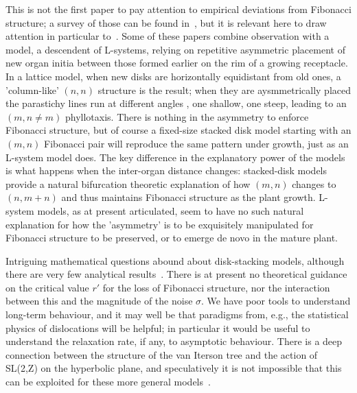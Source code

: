 \documentclass[a4paper,10pt]{amsart}
\begin{document}
 This is not the first paper to pay attention to empirical deviations from Fibonacci structure; a survey of those can be found in~\cite{swintonMathematicalPhyllotaxis2025}, but it is relevant here to draw attention in particular to~\cite{zagorska-marekSignificanceGandLdislocations2016,zagorska-marekVerbenaOfficinalisVerbenaceae2021,szpakPhyllotaxisInstabilityExploring2011,zagorska-marekVirtualPhyllotaxisReal2008,zhangPhyllotacticPatterningGerbera2021,zhangRepatterningInflorescenceMeristem2021}.
 Some of these papers combine observation with a model, a descendent of L-systems,  relying on repetitive asymmetric placement of new organ initia between those formed earlier on the rim of a growing receptacle. In a lattice model, when new disks are horizontally equidistant from old ones, a  'column-like' $(n,n)$ structure is the result; when they are aysmmetrically placed  the parastichy lines run at different angles , one shallow, one steep, leading to an $(m,n\neq m)$ phyllotaxis. There is nothing in the asymmetry to enforce Fibonacci structure, but of course a fixed-size stacked disk model starting with an $(m,n)$ Fibonacci pair will reproduce the same pattern under growth, just as an L-system model does. The key difference in the explanatory power of the models is what happens when the inter-organ distance changes: stacked-disk models provide a natural bifurcation theoretic explanation of how $(m,n)$ changes to $(n,m+n)$ and thus maintains Fibonacci structure as the plant growth. L-system models, as at present articulated, seem to have no such natural explanation for how the 'asymmetry' is to be exquisitely manipulated for Fibonacci structure to be preserved, or to emerge de novo in the mature plant. 
 

Intriguing mathematical questions abound about  disk-stacking models, although there are very few analytical results~\cite{goleConvergenceDiskStacking2020}. There is at present no theoretical guidance on the critical value $r'$ for the loss of Fibonacci structure, nor the interaction between this and the magnitude of the noise $\sigma$.  We have poor tools to understand  long-term behaviour, and it may well be that paradigms from, e.g., the statistical physics of dislocations will be helpful; in  particular it would be useful to understand the relaxation rate, if any, to asymptotic behaviour.  There is a deep connection between the structure of the van Iterson tree and the action of SL(2,Z) on the hyperbolic plane, and speculatively it is not impossible that this can be exploited for these more general models~\cite{swintonMathematicalPhyllotaxis2023}.  
\end{document}
